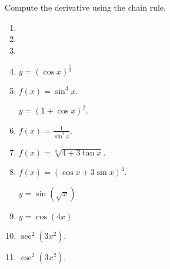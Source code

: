 Compute the derivative using the chain rule.
\begin{multicols}{2}
\begin{enumerate}[ref={\fcProblemRef}]
\item 
\item 

\item 
\item 
{} \label{problemd/dx((cosx)^(1/2))} $y = (\cos x)^{\frac{1}{2}}$


\item $\displaystyle f(x)=\sin^3 x$.

 \label{problemd/dx((1+cosx)^2)}  $y = (1+\cos x)^2$.


\item   $\displaystyle f(x)=\frac{1}{\sin^3x}$.

\item  $\displaystyle f(x)= \sqrt[3]{4+3\tan x}$.

\item  $f(x)=(\cos x + 3\sin x)^4$.


 \label{problemd/dx(sin(sqrt(x)))}  $\displaystyle y = \sin \left( \sqrt{x}\right)$

\item  $y = \cos\left( 4x\right)$


\item $\sec^2 (3x^2)$. 


\item $\csc^2 (3x^2)$. 


\end{enumerate}
\end{multicols}
